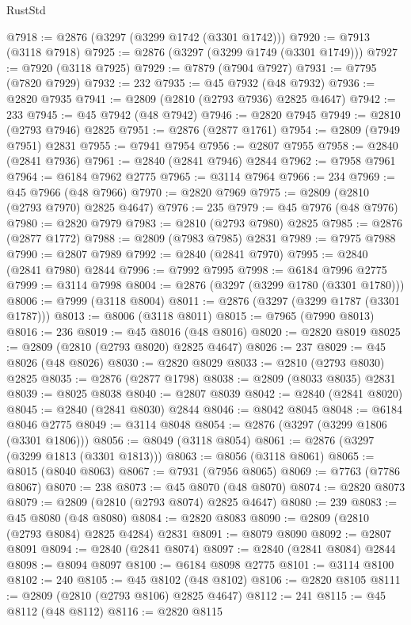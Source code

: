 \begin{lexlean}{RustStd}
\begin{coremodule}
@7918 := @2876 (@3297 (@3299 @1742 (@3301 @1742)))
@7920 := @7913 (@3118 @7918)
@7925 := @2876 (@3297 (@3299 @1749 (@3301 @1749)))
@7927 := @7920 (@3118 @7925)
@7929 := @7879 (@7904 @7927)
@7931 := @7795 (@7820 @7929)
@7932 := 232
@7935 := @45 @7932 (@48 @7932)
@7936 := @2820 @7935
@7941 := @2809 (@2810 (@2793 @7936) @2825 @4647)
@7942 := 233
@7945 := @45 @7942 (@48 @7942)
@7946 := @2820 @7945
@7949 := @2810 (@2793 @7946) @2825
@7951 := @2876 (@2877 @1761)
@7954 := @2809 (@7949 @7951) @2831
@7955 := @7941 @7954
@7956 := @2807 @7955
@7958 := @2840 (@2841 @7936)
@7961 := @2840 (@2841 @7946) @2844
@7962 := @7958 @7961
@7964 := @6184 @7962 @2775
@7965 := @3114 @7964
@7966 := 234
@7969 := @45 @7966 (@48 @7966)
@7970 := @2820 @7969
@7975 := @2809 (@2810 (@2793 @7970) @2825 @4647)
@7976 := 235
@7979 := @45 @7976 (@48 @7976)
@7980 := @2820 @7979
@7983 := @2810 (@2793 @7980) @2825
@7985 := @2876 (@2877 @1772)
@7988 := @2809 (@7983 @7985) @2831
@7989 := @7975 @7988
@7990 := @2807 @7989
@7992 := @2840 (@2841 @7970)
@7995 := @2840 (@2841 @7980) @2844
@7996 := @7992 @7995
@7998 := @6184 @7996 @2775
@7999 := @3114 @7998
@8004 := @2876 (@3297 (@3299 @1780 (@3301 @1780)))
@8006 := @7999 (@3118 @8004)
@8011 := @2876 (@3297 (@3299 @1787 (@3301 @1787)))
@8013 := @8006 (@3118 @8011)
@8015 := @7965 (@7990 @8013)
@8016 := 236
@8019 := @45 @8016 (@48 @8016)
@8020 := @2820 @8019
@8025 := @2809 (@2810 (@2793 @8020) @2825 @4647)
@8026 := 237
@8029 := @45 @8026 (@48 @8026)
@8030 := @2820 @8029
@8033 := @2810 (@2793 @8030) @2825
@8035 := @2876 (@2877 @1798)
@8038 := @2809 (@8033 @8035) @2831
@8039 := @8025 @8038
@8040 := @2807 @8039
@8042 := @2840 (@2841 @8020)
@8045 := @2840 (@2841 @8030) @2844
@8046 := @8042 @8045
@8048 := @6184 @8046 @2775
@8049 := @3114 @8048
@8054 := @2876 (@3297 (@3299 @1806 (@3301 @1806)))
@8056 := @8049 (@3118 @8054)
@8061 := @2876 (@3297 (@3299 @1813 (@3301 @1813)))
@8063 := @8056 (@3118 @8061)
@8065 := @8015 (@8040 @8063)
@8067 := @7931 (@7956 @8065)
@8069 := @7763 (@7786 @8067)
@8070 := 238
@8073 := @45 @8070 (@48 @8070)
@8074 := @2820 @8073
@8079 := @2809 (@2810 (@2793 @8074) @2825 @4647)
@8080 := 239
@8083 := @45 @8080 (@48 @8080)
@8084 := @2820 @8083
@8090 := @2809 (@2810 (@2793 @8084) @2825 @4284) @2831
@8091 := @8079 @8090
@8092 := @2807 @8091
@8094 := @2840 (@2841 @8074)
@8097 := @2840 (@2841 @8084) @2844
@8098 := @8094 @8097
@8100 := @6184 @8098 @2775
@8101 := @3114 @8100
@8102 := 240
@8105 := @45 @8102 (@48 @8102)
@8106 := @2820 @8105
@8111 := @2809 (@2810 (@2793 @8106) @2825 @4647)
@8112 := 241
@8115 := @45 @8112 (@48 @8112)
@8116 := @2820 @8115

\end{coremodule}
\end{lexlean}
